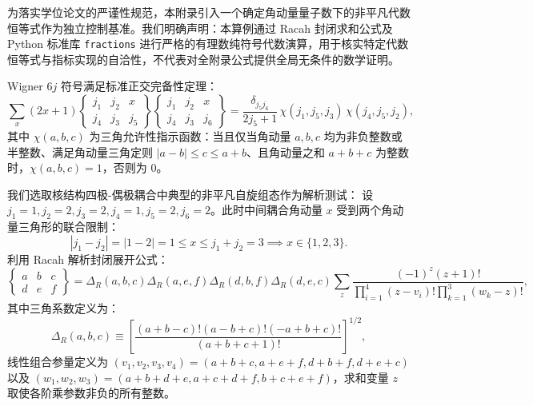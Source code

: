 为落实学位论文的严谨性规范，本附录引入一个确定角动量量子数下的非平凡代数恒等式作为独立控制基准。我们明确声明：本算例通过 Racah 封闭求和公式及 Python 标准库 \texttt{fractions} 进行严格的有理数纯符号代数演算，用于核实特定代数恒等式与指标实现的自洽性，不代表对全附录公式提供全局无条件的数学证明。

Wigner $6j$ 符号满足标准正交完备性定理：
\begin{equation}\label{eq:appA-6j-ortho-theorem}
\sum_x (2x + 1) \begin{Bmatrix} j_1 & j_2 & x \\ j_4 & j_3 & j_5 \end{Bmatrix} \begin{Bmatrix} j_1 & j_2 & x \\ j_4 & j_3 & j_6 \end{Bmatrix} = \frac{\delta_{j_5 j_6}}{2j_5 + 1} \, \chi(j_1, j_5, j_3) \, \chi(j_4, j_5, j_2) ,
\end{equation}
其中 $\chi(a, b, c)$ 为三角允许性指示函数：当且仅当角动量 $a, b, c$ 均为非负整数或半整数、满足角动量三角定则 $|a - b| \le c \le a + b$、且角动量之和 $a + b + c$ 为整数时，$\chi(a, b, c) = 1$，否则为 0。

我们选取核结构四极-偶极耦合中典型的非平凡自旋组态作为解析测试：
设 $j_1 = 1, j_2 = 2, j_3 = 2, j_4 = 1, j_5 = 2, j_6 = 2$。此时中间耦合角动量 $x$ 受到两个角动量三角形的联合限制：
\begin{equation}
|j_1 - j_2| = |1 - 2| = 1 \le x \le j_1 + j_2 = 3 \implies x \in \{1, 2, 3\} .
\end{equation}
利用 Racah 解析封闭展开公式：
\begin{equation}\label{eq:appA-racah-formula}
\begin{Bmatrix} a & b & c \\ d & e & f \end{Bmatrix} = \Delta_R(a,b,c) \Delta_R(a,e,f) \Delta_R(d,b,f) \Delta_R(d,e,c) \sum_z \frac{(-1)^z (z+1)!}{\prod_{i=1}^4 (z - v_i)! \prod_{k=1}^3 (w_k - z)!} ,
\end{equation}
其中三角系数定义为：
\begin{equation}\label{eq:appA-delta-r-def}
\Delta_R(a,b,c) \equiv \left[ \frac{(a+b-c)!(a-b+c)!(-a+b+c)!}{(a+b+c+1)!} \right]^{1/2} ,
\end{equation}
线性组合参量定义为 $(v_1, v_2, v_3, v_4) = (a+b+c, a+e+f, d+b+f, d+e+c)$ 以及 $(w_1, w_2, w_3) = (a+b+d+e, a+c+d+f, b+c+e+f)$，求和变量 $z$ 取使各阶乘参数非负的所有整数。

